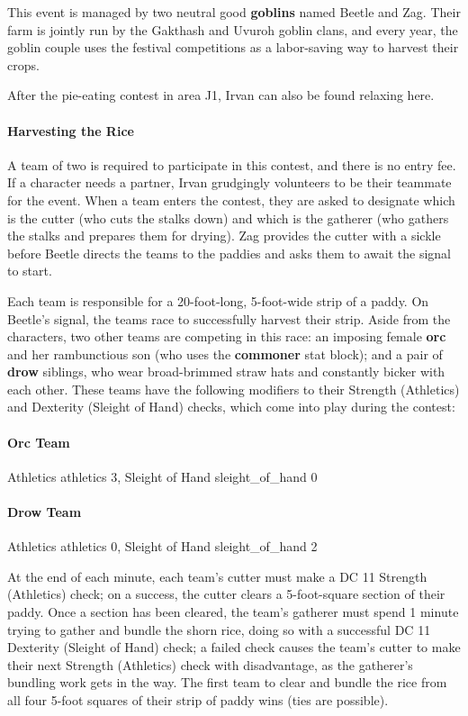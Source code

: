 \documentclass[a4paper, 11pt, bg=full, twocolumn, nooutline]{dndbook}
\begin{document}
This event is managed by two neutral good \textbf{goblins} named Beetle and Zag. Their farm is jointly run by the Gakthash and Uvuroh goblin clans, and every year, the goblin couple uses the festival competitions as a labor-saving way to harvest their crops.

After the pie-eating contest in area J1, Irvan can also be found relaxing here.

\paragraph{Harvesting the Rice}

A team of two is required to participate in this contest, and there is no entry fee. If a character needs a partner, Irvan grudgingly volunteers to be their teammate for the event. When a team enters the contest, they are asked to designate which is the cutter (who cuts the stalks down) and which is the gatherer (who gathers the stalks and prepares them for drying). Zag provides the cutter with a sickle before Beetle directs the teams to the paddies and asks them to await the signal to start.

Each team is responsible for a 20-foot-long, 5-foot-wide strip of a paddy. On Beetle's signal, the teams race to successfully harvest their strip. Aside from the characters, two other teams are competing in this race: an imposing female \textbf{orc} and her rambunctious son (who uses the \textbf{commoner} stat block); and a pair of \textbf{drow} siblings, who wear broad-brimmed straw hats and constantly bicker with each other. These teams have the following modifiers to their Strength (Athletics) and Dexterity (Sleight of Hand) checks, which come into play during the contest:

\paragraph{Orc Team}

Athletics athletics 3, Sleight of Hand sleight\_of\_hand 0

\paragraph{Drow Team}

Athletics athletics 0, Sleight of Hand sleight\_of\_hand 2

At the end of each minute, each team's cutter must make a DC 11 Strength (Athletics) check; on a success, the cutter clears a 5-foot-square section of their paddy. Once a section has been cleared, the team's gatherer must spend 1 minute trying to gather and bundle the shorn rice, doing so with a successful DC 11 Dexterity (Sleight of Hand) check; a failed check causes the team's cutter to make their next Strength (Athletics) check with disadvantage, as the gatherer's bundling work gets in the way. The first team to clear and bundle the rice from all four 5-foot squares of their strip of paddy wins (ties are possible).
\end{document}
